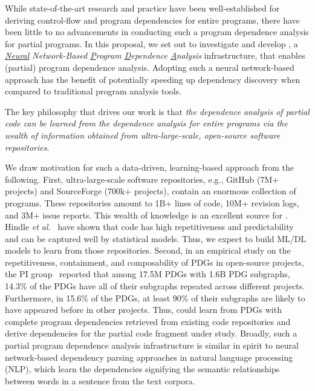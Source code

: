 While state-of-the-art research and practice have been well-established for deriving control-flow and program dependencies for entire programs, there have been little to no advancements in conducting such a program dependence analysis for partial programs. In this proposal, we set out to investigate and develop {\tool}, a {\em \underline{Neural} Network-Based \underline{P}rogram \underline{D}ependence \underline{A}nalysis} infrastructure, that enables (partial) program dependence analysis. Adopting such a neural network-based approach has the benefit of potentially speeding up dependency discovery when compared to traditional program analysis tools.

\begin{center}
    \begin{minipage}{33.5em}
    The key philosophy that drives our work is that {\em the dependence analysis of partial code can be learned from the dependence analysis for entire programs via the wealth of information obtained from ultra-large-scale, open-source software repositories}.
    \end{minipage}
\end{center}

We draw motivation for such a data-driven, learning-based approach from the following. First, ultra-large-scale software repositories, e.g., GitHub (7M+ projects) and SourceForge (700k+ projects), contain an enormous collection of programs. These repositories amount to 1B+ lines of code, 10M+ revision logs, and 3M+ issue reports. This wealth of knowledge is an excellent source for {\tool}. Hindle {\em et al.}~\cite{naturalness-icse12} have shown that code has high repetitiveness and predictability and can be captured well by statistical models. Thus, we expect to build ML/DL models to learn from those repositories. Second, in an empirical study on the repetitiveness, containment, and composability of PDGs in open-source projects, the PI group~\cite{msr16} reported that among 17.5M PDGs with 1.6B PDG subgraphs, 14.3\% of the PDGs have all of their subgraphs repeated across different projects. Furthermore, in 15.6\% of the PDGs, at least 90\% of their subgraphs are likely to have appeared before in other projects. Thus, {\tool} could learn from PDGs with complete program dependencies retrieved from existing code repositories and derive dependencies for the partial code fragment under study. Broadly, such a partial program dependence analysis infrastructure is similar in spirit to neural network-based dependency parsing approaches in natural language processing (NLP), which learn the dependencies signifying the semantic relationships between words in a sentence from the text corpora.


